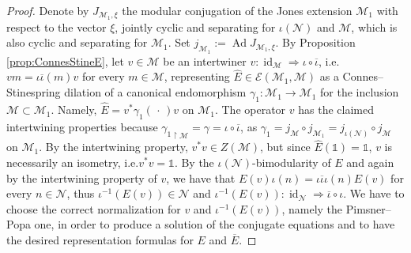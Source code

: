 \documentclass[11pt,a4paper]{article}
\makeatletter
\newcommand{\oneop}{\mathds{1}}
\newcommand{\iotabar}{{\overline{\iota}}}
\newcommand{\Ehat}{{\widehat{E}}}
\newcommand{\Ebar}{{\overline{E}}}
\newcommand{\slot}{{\,\cdot \,}}
\newcommand{\E}{\mathcal{E}}
\newcommand{\M}{\mathcal{M}}
\newcommand{\N}{\mathcal{N}}
\DeclareMathOperator{\Ad}{Ad}
\DeclareMathOperator{\id}{id}
\DeclareRobustCommand{\ie}{i.e.\@\xspace}
\theoremstyle{plain}
\theoremstyle{definition}
\theoremstyle{remark}
\numberwithin{equation}{section}%
\makeatother
\begin{document}
\begin{proof}
Denote by $J_{\M_1,\xi}$ the modular conjugation of the Jones extension $\M_1$ with respect to the vector $\xi$, jointly cyclic and separating for $\iota(\N)$ and $\M$, which is also cyclic and separating for $\M_1$. Set $j_{\M_1} := \Ad J_{\M_1,\xi}$. By Proposition \ref{prop:ConnesStineE}, let $v\in\M$ be an intertwiner $v:\id_\M \Rightarrow \iota \circ \iotabar$, \ie $v m = \iota\iotabar(m) v$ for every $m\in\M$, representing $\Ehat\in\E(\M_1,\M)$ as a Connes--Stinespring dilation of a canonical endomorphism $\gamma_1: \M_1 \to \M_1$ for the inclusion $\M\subset\M_1$. Namely, $\Ehat= v^* \gamma_1(\slot) v$ on $\M_1$. The operator $v$ has the claimed intertwining properties because ${\gamma_1}_{\restriction \M} = \gamma = \iota\circ\iotabar$, as $\gamma_1 = j_\M \circ j_{\M_1} = j_{\iota(\N)} \circ j_{\M}$ on $\M_1$.
By the intertwining property, $v^*v\in Z(\M)$, but since $\Ehat(\oneop) = \oneop$, $v$ is necessarily an isometry, \ie $v^*v = \oneop$.
By the $\iota(\N)$-bimodularity of $E$ and again by the intertwining property of $v$, we have that $E(v) \iota(n) = \iota\iotabar\iota(n) E(v)$ for every $n\in\N$, thus $\iota^{-1} (E(v))\in\N$ and $\iota^{-1}(E(v)) : \id_{\N} \Rightarrow \iotabar\circ\iota$. We have to choose the correct normalization for $v$ and $\iota^{-1}(E(v))$, namely the Pimsner--Popa one, in order to produce a solution of the conjugate equations and to have the desired representation formulas for $E$ and $\Ebar$. 


\end{proof}
\end{document}

